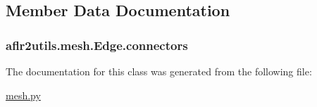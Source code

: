 \subsection{Member Data Documentation}
\hypertarget{classaflr2utils_1_1mesh_1_1Edge_a603d7b5e739427130f9855a98fefc62b}{
\subsubsection[{connectors}]{\setlength{\rightskip}{0pt plus 5cm}aflr2utils.\-mesh.\-Edge.\-connectors}}\label{classaflr2utils_1_1mesh_1_1Edge_a603d7b5e739427130f9855a98fefc62b}


The documentation for this class was generated from the following file\-:\begin{DoxyCompactItemize}
\item 
\hyperlink{mesh_8py}{mesh.\-py}\end{DoxyCompactItemize}
